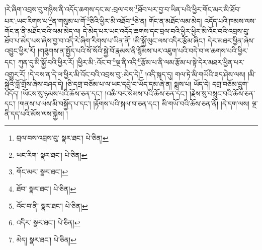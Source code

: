།རེ་ཞིག་འབྲས་བུ་གཉིས་ནི་འདོད་ཆགས་དང་མ་:བྲལ་བས་\footnote{བྲལ་བས་འབྲས་བུ་  སྣར་ཐང་།  པེ་ཅིན། }ཐོབ་པར་བྱ་བ་ཡིན་པའི་ཕྱིར་གོང་མར་མི་ཐོབ་པར་:ཡང་རིགས་པ་\footnote{ཡང་རིག་  སྣར་ཐང་།  པེ་ཅིན། }ན་གསུམ་པ་གོ་\footnote{གོང་མར་  སྣར་ཐང་། }ཅིའི་ཕྱིར་མི་འཐོབ་\footnote{ཐོབ་  སྣར་ཐང་།  པེ་ཅིན། }ཅེ་ན། གོང་ན་མཐོང་ལམ་མེད། འདོད་པའི་ཁམས་ལས་གོང་ན་ནི་མཐོང་བའི་ལམ་མེད་ལ། དེ་མེད་པར་ཡང་འདོད་ཆགས་དང་བྲལ་བའི་ཕྱིར་ཕྱིར་མི་འོང་བའི་འབྲས་བུ་ཐོབ་པ་མེད་པས་ཞེས་བྱ་བ་འདི་རེ་ཞིག་རིགས་པ་ཡིན་ནོ། །མི་སྐྱོ་ལུང་ལས་འདིར་རྩོམ་ཞིང་། དེར་མཐར་ཕྱིན་ཞེས་འབྱུང་ཕྱིར་རོ། །གཟུགས་ན་སྤྱོད་པའི་སོ་སོའི་སྐྱེ་བོ་རྣམས་ནི་སྙོམས་པར་འཇུག་པའི་བདེ་བ་ལ་ཆགས་པའི་ཕྱིར་དང་། ཀུན་དུ་མི་སྐྱོ་བའི་ཕྱིར་རོ། །ཕྱིར་མི་:འོང་བ་\footnote{འོང་བ་ནི་  སྣར་ཐང་།  པེ་ཅིན། }ལྔ་ནི་འདི་\footnote{འདིར་  སྣར་ཐང་།  པེ་ཅིན། }རྩོམ་པ་ནི་ལམ་རྩོམ་པ་སྟེ་དེར་མཐར་ཕྱིན་པར་འགྱུར་རོ། །དེ་བས་ན་དེ་ལ་ཕྱིར་མི་འོང་བའི་འབྲས་བུ་:མེད་དེ།\footnote{མེད།  སྣར་ཐང་།  པེ་ཅིན། } །འདི་སྐད་དུ། གལ་ཏེ་མི་གཡོའི་ཟད་ཤེས་ལས། །མི་སྐྱེའི་བློ་གྲོས་ཞེས་བཤད་དེ། །ཅི་དགྲ་བཅོམ་པ་ལ་ཡང་དབྱེ་བ་ཡོད་དམ་ཞེ་ན། སྨྲས་པ། ཡོད་དེ། དགྲ་བཅོམ་དྲུག་འདོད། །ཡོངས་སུ་ཉམས་པའི་ཆོས་ཅན་དང་། །འཆི་བར་སེམས་པའི་ཆོས་ཅན་དང་། །རྗེས་སུ་བསྲུང་བའི་ཆོས་ཅན་དང་། །གནས་པ་ལས་མི་བསྐྱོད་པ་དང་། །རྟོགས་པའི་སྐལ་བ་ཅན་དང་། མི་གཡོ་བའི་ཆོས་ཅན་ནོ། །དེ་དག་ལས། ལྔ་ནི་དད་པའི་མོས་ལས་སྐྱེས། །
